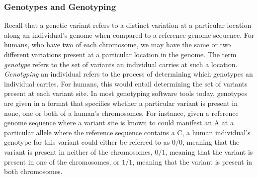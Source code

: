 \subsubsection{Genotypes and Genotyping} \label{background:biology:genotype_and_genotyping}
Recall that a genetic variant refers to a distinct variation at a particular location along an individual's genome when compared to a reference genome sequence.
For humans, who have two of each chromosome, we may have the same or two different variations present at a particular location in the genome.
The term \textit{genotype} refers to the set of variants an individual carries at such a location.
\textit{Genotyping} an individual refers to the process of determining which genotypes an individual carries. 
For humans, this would entail determining the set of variants present at each variant site.
In most genotyping software tools today, genotypes are given in a format that specifies whether a particular variant is present in none, one or both of a human's chromosomes.
For instance, given a reference genome sequence where a variant site is known to could manifest an A at a particular allele where the reference sequence contains a C, a human individual's genotype for this variant could either be referred to as $0/0$, meaning that the variant is present in neither of the chromosomes, $0/1$, meaning that the variant is present in one of the chromosomes, or $1/1$, meaning that the variant is present in both chromosomes.


